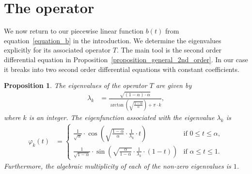 \documentclass[11pt,reqno]{amsart}
\newtheorem{proposition}[lemma]{Proposition}
\theoremstyle{definition}
\numberwithin{equation}{section}
\begin{document}
\section{The operator}
\label{section_alpha}

We now return to our piecewise linear function $b(t)$ from 
equation~\eqref{equation_b} in the introduction.
We determine the eigenvalues explicitly for its associated operator $T$.
The main tool is the second order differential equation in
Proposition~\ref{proposition_general_2nd_order}.
In our case it breaks into two second order differential equations
with constant coefficients.


\begin{proposition}
The eigenvalues of the operator $T$ are given by
\begin{align}
\lambda_{k}
& =
\frac{\sqrt{(1-\alpha) \cdot \alpha}}
{
\arctan\left(\sqrt{\frac{1-\alpha}{\alpha}}\right)
+
\pi \cdot k
} ,
\label{equation_eigenvalue}
\end{align}
where $k$ is an integer.
The eigenfunction associated with the eigenvalue $\lambda_{k}$ is
\begin{align*}
\varphi_{k}(t)
& =
\begin{cases}
\frac{1}{\sqrt{\alpha}}
\cdot
\cos\left( \sqrt{\frac{1-\alpha}{\alpha}} \cdot \frac{1}{\lambda_{k}} \cdot  t \right)
&
\text{if } 0 \leq t \leq \alpha , 
\\
\frac{1}{\sqrt{1-\alpha}}
\cdot
\sin\left( \sqrt{\frac{\alpha}{1-\alpha}} \cdot \frac{1}{\lambda_{k}} \cdot (1-t) \right)
&
\text{if } \alpha \leq t \leq 1 . 
\end{cases}
\end{align*}
Furthermore, the algebraic multiplicity of each of the non-zero
eigenvalues is $1$.
\end{proposition}
\end{document}
